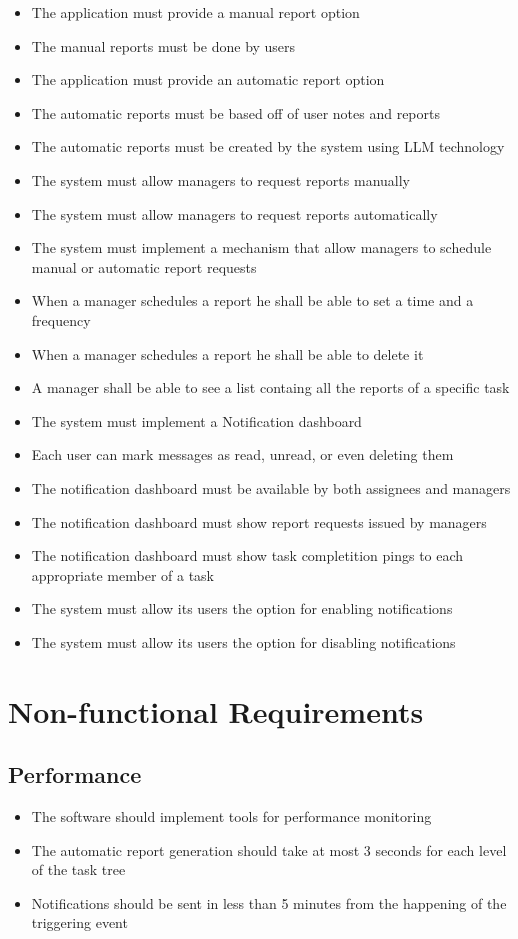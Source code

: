 \documentclass{article}
\begin{document}
\begin{itemize}
    \item The application must provide a manual report option
    \item The manual reports must be done by users
    \item The application must provide an automatic report option
    \item The automatic reports must be based off of user notes and reports
    \item The automatic reports must be created by the system using LLM technology
    \item The system must allow managers to request reports manually
    \item The system must allow managers to request reports automatically
    \item The system must implement a mechanism that allow managers to schedule manual or automatic report requests
    \item When a manager schedules a report he shall be able to set a time and a frequency
    \item When a manager schedules a report he shall be able to delete it
    \item A manager shall be able to see a list containg all the reports of a specific task
    \item The system must implement a Notification dashboard
    \item Each user can mark messages as read, unread, or even deleting them
    \item The notification dashboard must be available by both assignees and managers
    \item The notification dashboard must show report requests issued by managers
    \item The notification dashboard must show task completition pings to each appropriate member of a task
    \item The system must allow its users the option for enabling notifications
    \item The system must allow its users the option for disabling notifications
\end{itemize}

\section{Non-functional Requirements}
\subsection{Performance}
\begin{itemize}
    \item The software should implement tools for performance monitoring
    \item The automatic report generation should take at most 3 seconds for each level of the task tree
    \item Notifications should be sent in less than 5 minutes from the happening of the triggering event
\end{itemize}
\end{document}
